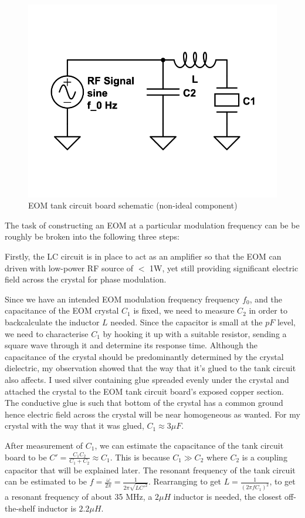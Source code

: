 \documentclass[12pt]{report}
\begin{document}
\begin{figure}[H]
    \centering
    \includegraphics[width=.5\textwidth]{eom-tank-cirucuit1.png}
    \caption{EOM tank circuit board schematic (non-ideal component)}
    \label{fig:eom-tank-cirucuit1}
\end{figure}

The task of constructing an EOM at a particular modulation frequency can be be roughly be broken into the following three steps:
\par
Firstly, the LC circuit is in place to act as an amplifier so that the EOM can driven with low-power RF source of $<$ 1W, yet still providing significant electric field across the crystal for phase modulation. 
\par
Since we have an intended EOM modulation frequency frequency $f_0$, and the capacitance of the EOM crystal $C_1$ is fixed, we need to measure $C_2$ in order to backcalculate the inductor $L$ needed. Since the capacitor is small at the $pF$ level, we need to characterise $C_1$ by hooking it up with a suitable resistor, sending a square wave through it and determine its response time. Although the capacitance of the crystal should be predominantly determined by the crystal dielectric, my observation showed that the way that it's glued to the tank circuit also affects. I used silver containing glue spreaded evenly under the crystal and attached the crystal to the EOM tank circuit board's exposed copper section. The conductive glue is such that bottom of the crystal has a common ground hence electric field across the crystal will be near homogeneous as wanted. For my crystal with the way that it was glued, $C_1 \approx 3 \mu F$.
\par
After measurement of $C_1$, we can estimate the capacitance of the tank circuit board to be $C' = \frac{C_1C_2}{C_1+C_2} \approx C_1$. This is because $C_1 \gg C_2$ where $C_2$ is a coupling capacitor that will be explained later. The resonant frequency of the tank circuit can be estimated to be $f = \frac{\omega}{2\pi} = \frac{1}{2\pi\sqrt{LC'^2}}$. Rearranging to get $L = \frac{1}{(2\pi f C_1)^2}$, to get a resonant frequency of about 35 MHz, a $2 \mu H$ inductor is needed, the closest off-the-shelf inductor is $2.2 \mu H$. 
\end{document}
